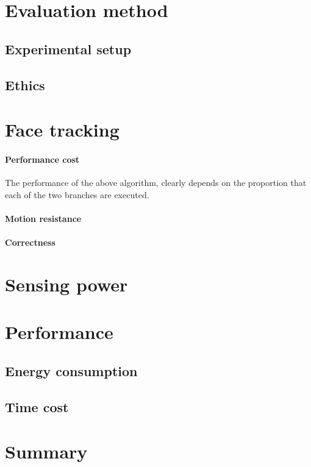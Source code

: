 \section{Evaluation method}
\subsection{Experimental setup}
\subsection{Ethics}
\section{Face tracking}
\label{section:face_tracking}
\paragraph{Performance cost}
The performance of the above algorithm, clearly depends on the proportion that each of the two branches are executed.
\paragraph{Motion resistance}

\paragraph{Correctness}

\section{Sensing power}
\section{Performance}
\subsection{Energy consumption}
\subsection{Time cost}
\section{Summary}